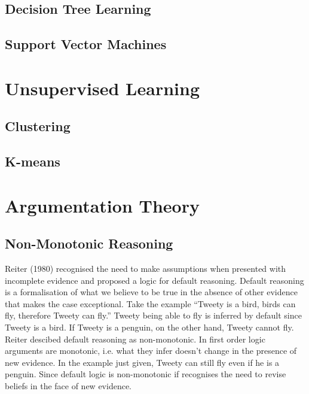 \subsection{Decision Tree Learning}

\subsection{Support Vector Machines}

\section{Unsupervised Learning}

\subsection{Clustering}

\subsection{K-means}


\section{Argumentation Theory}

\subsection{Non-Monotonic Reasoning}


Reiter (1980) recognised the need to make assumptions when presented with incomplete evidence and proposed a logic for default reasoning. Default reasoning is a formalisation of what we believe to be true in the absence of other evidence that makes the case exceptional.
Take the example “Tweety is a bird, birds can fly, therefore Tweety can fly.” Tweety being able to fly is inferred by default since Tweety is a bird. If Tweety is a penguin, on the other hand, Tweety cannot fly. Reiter descibed default reasoning as non-monotonic. In first order logic arguments are monotonic, i.e. what they infer doesn’t change in the presence of new evidence. In the example just given, Tweety can still fly even if he is a penguin. Since default logic is non-monotonic if recognises the need to revise beliefs in the face of new evidence.

